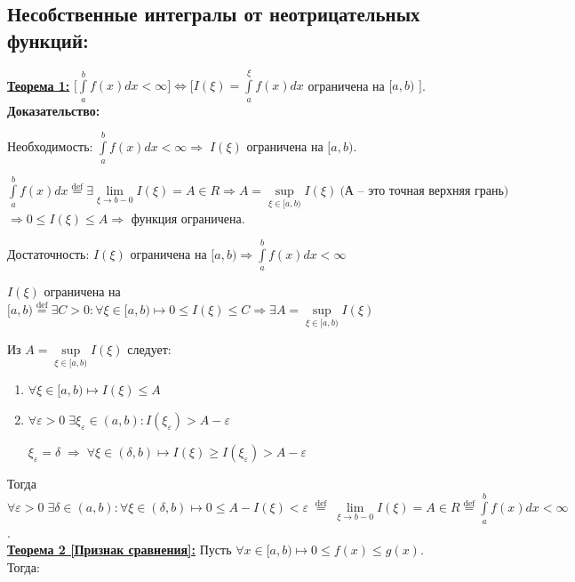 \documentclass[a4paper,12pt]{article} %
\newcommand{\eqdef}{\stackrel{\mathrm{def}}{=}}
\renewcommand {\geq}{\geqslant}
\renewcommand {\leq}{\leqslant}
\renewcommand {\epsilon}{\varepsilon}
\begin{document}
\subsection{Несобственные интегралы от неотрицательных функций:}

\underline{\textbf{Теорема 1:}} $\bigl[ \int\limits_a^{b} f(x) dx <\infty \bigr] \Leftrightarrow \bigl[ I(\xi) = \int\limits_a^{\xi} f(x) dx$ \;ограничена\; на\; $[a, b)$ $\bigr]$.\\

\textbf{Доказательство:} 

Необходимость: $\int\limits_a^{b} f(x) dx < \infty \Rightarrow\; I(\xi)$ ограничена на $[a, b)$.

$\int\limits_a^{b} f(x) dx \stackrel{\text{def}}{=} \exists \lim\limits_{\xi \rightarrow b-0}I(\xi) = A \in R \Rightarrow A = \sup\limits_{\xi \in[a,b)} I(\xi) ~ \text{(А -- это точная верхняя грань)} $ $\Rightarrow 0 \leq I(\xi) \leq A \Rightarrow$ функция ограничена.

Достаточность: $I(\xi)$  ограничена на $[a, b) \Rightarrow \int\limits_a^{b} f(x) dx < \infty$

$I(\xi)$ ограничена на $[a, b) \stackrel{\text{def}}{=} \exists C>0 : \forall \xi \in[a, b) \longmapsto 0 \leq I(\xi) \leq C \Rightarrow \exists A = \sup\limits_{\xi \in [a,b)}I(\xi)$

Из $A = \sup\limits_{\xi \in[a,b)} I(\xi)$ следует:

\begin{enumerate}
    \item $\forall \xi \in [a, b) \mapsto I(\xi) \leq A$
    
    \item $\forall \varepsilon > 0\; \exists \xi_\varepsilon \in (a, b) : I(\xi_\varepsilon)>A-\varepsilon$
    
    $\xi_\varepsilon = \delta \; \Rightarrow \; \forall \xi \in(\delta, b) \longmapsto I(\xi) \geq I(\xi_\epsilon)> A-\varepsilon$
\end{enumerate}

Тогда $\forall \varepsilon > 0 \; \exists\delta\in(a, b): \forall \xi \in(\delta, b) \longmapsto 0\leq A-I(\xi) < \varepsilon \; \stackrel{\text{def}}{=}\; \lim\limits_{\xi \rightarrow b-0} I(\xi) = A \in R \eqdef \int\limits_a^{b} f(x) dx < \infty$.\\

\underline{\textbf{Теорема 2 [Признак сравнения]:}} Пусть $\forall x \in [a, b) \longmapsto 0\leq f(x) \leq g(x)$. Тогда:
\end{document}

